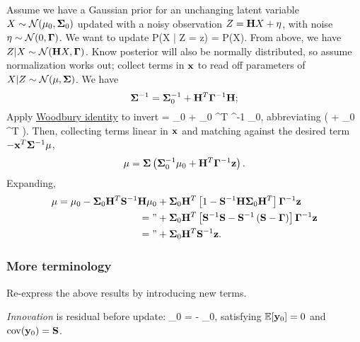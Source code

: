 \documentclass[notitlepage,openany,11pt]{report}
\DeclareMathOperator{\cov}{cov}
\theoremstyle{plain}%
\numberwithin{equation}{section}
\begin{document}
Assume we have a Gaussian prior for an unchanging latent variable $X \sim \mathcal{N}(\mathbf{\mu}_0, \mathbf{\Sigma}_0)$ updated with a noisy observation $Z = \mathbf{H}X + \mathbf{\eta}$, with noise $\eta \sim \mathcal{N}(0, \mathbf{\Gamma})$. We want to update
\be
P(X | Z = z) =  P(X).
\ee
From above, we have $Z | X \sim \mathcal{N}(\mathbf{H}X, \mathbf{\Gamma})$. Know posterior will also be normally distributed, so assume normalization works out; collect terms in $\mathbf{x}$ to read off parameters of $X | Z \sim \mathcal{N}(\mathbf{\mu}, \mathbf{\Sigma})$. We have
\begin{equation}
\label{eq-kal-1}
\mathbf{\Sigma}^{-1} = \mathbf{\Sigma}_0^{-1} + \mathbf{H}^{T} \mathbf{\Gamma}^{-1} \mathbf{H};
\end{equation}
Apply \href{https://en.wikipedia.org/wiki/Woodbury_matrix_identity}{Woodbury identity} to invert
\be
\mbf{\Sigma} = \mbf{\Sigma}_0 + \mbf{\Sigma}_0 ^{T} ^{-1}  \mbf{\Sigma}_0,
\ee
abbreviating
\be
{} \equiv \left( \mbf{\Gamma} +  \mbf{\Sigma}_{0} ^{T} \right).
\ee
Then, collecting terms linear in $\mathbf{x}$ and matching against the desired term $- \mathbf{x}^{T} \mathbf{\Sigma}^{-1} \mathbf{\mu}$,
\begin{equation}
\label{eq-kal-2}
\mathbf{\mu} = \mathbf{\Sigma}\left( \mathbf{\Sigma}_0^{-1} \mathbf{\mu}_{0} + \mathbf{H}^{T} \mathbf{\Gamma}^{-1}\mathbf{z} \right).
\end{equation}
Expanding,
\begin{align*}
\mathbf{\mu} = \mathbf{\mu}_0 - \mathbf{\Sigma}_0 \mathbf{H}^{T} \mathbf{S}^{-1} \mathbf{H} \mathbf{\mu}_0 &+ \mathbf{\Sigma}_0 \mathbf{H}^{T} \left[ 1 - \mathbf{S}^{-1} \mathbf{H} \mathbf{\Sigma}_{0} \mathbf{H}^{T} \right] \mathbf{\Gamma}^{-1} \mathbf{z} \\
 = \text{''} &+ \mathbf{\Sigma}_0 \mathbf{H}^{T} \left[ \mathbf{S}^{-1} \mathbf{S} - \mathbf{S}^{-1} \left( \mathbf{S} - \mathbf{\Gamma} \right) \right] \mathbf{\Gamma}^{-1} \mathbf{z} \\
  = \text{''} &+ \mathbf{\Sigma}_0 \mathbf{H}^{T} \mathbf{S}^{-1} \mathbf{z}.
\end{align*}

\subsubsection{More terminology}
Re-express the above results by introducing new terms. 

\emph{Innovation} is residual before update:
\be
{}_0 =  -  \mbf{\mu}_0,
\ee
satisfying $\mathbb{E}[\mathbf{y}_0] = 0$ and $\cov(\mbf{y}_0) = \mbf{S}$. 
\end{document}
